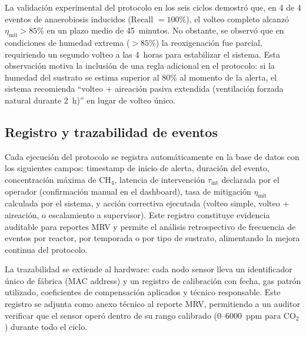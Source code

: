 La validación experimental del protocolo en los seis ciclos demostró que, en 4 de 4 eventos de anaerobiosis inducidos (Recall $= 100$\%), el volteo completo alcanzó $\eta_{\mathrm{mit}} > 85$\% en un plazo medio de 45~minutos. No obstante, se observó que en condiciones de humedad extrema ($> 85$\%) la reoxigenación fue parcial, requiriendo un segundo volteo a las 4~horas para estabilizar el sistema. Esta observación motiva la inclusión de una regla adicional en el protocolo: si la humedad del sustrato se estima superior al 80\% al momento de la alerta, el sistema recomienda ``volteo + aireación pasiva extendida (ventilación forzada natural durante 2~h)'' en lugar de volteo único.

\subsection{Registro y trazabilidad de eventos}
\label{subsec:cap5_registro_eventos}

Cada ejecución del protocolo se registra automáticamente en la base de datos con los siguientes campos: timestamp de inicio de alerta, duración del evento, concentración máxima de CH$_4$, latencia de intervención $\tau_{\mathrm{int}}$ declarada por el operador (confirmación manual en el dashboard), tasa de mitigación $\eta_{\mathrm{mit}}$ calculada por el sistema, y acción correctiva ejecutada (volteo simple, volteo + aireación, o escalamiento a supervisor). Este registro constituye evidencia auditable para reportes MRV y permite el análisis retrospectivo de frecuencia de eventos por reactor, por temporada o por tipo de sustrato, alimentando la mejora continua del protocolo.

La trazabilidad se extiende al hardware: cada nodo sensor lleva un identificador único de fábrica (MAC address) y un registro de calibración con fecha, gas patrón utilizado, coeficientes de compensación aplicados y técnico responsable. Este registro se adjunta como anexo técnico al reporte MRV, permitiendo a un auditor verificar que el sensor operó dentro de su rango calibrado (0--6000~ppm para CO$_2$) durante todo el ciclo.
